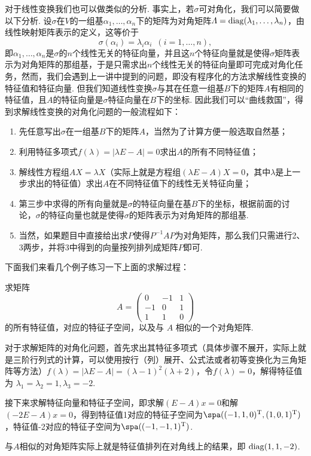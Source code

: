 对于线性变换我们也可以做类似的分析. 事实上，若$\sigma$可对角化，我们可以简要做以下分析. 设$\sigma$在$V$的一组基$\alpha_1,\ldots,\alpha_n$下的矩阵为对角矩阵$\varLambda=\operatorname{diag}(\lambda_1,\ldots,\lambda_n)$，由线性映射矩阵表示的定义，这等价于
\[\sigma(\alpha_i)=\lambda_i\alpha_i\enspace(i=1,\ldots,n),\]
即$\alpha_1,\ldots,\alpha_n$是$\sigma$的$n$个线性无关的特征向量，并且这$n$个特征向量就是使得$\sigma$矩阵表示为对角矩阵的那组基，于是只需求出$n$个线性无关的特征向量即可完成对角化任务，然而，我们会遇到上一讲中提到的问题，即没有程序化的方法求解线性变换的特征值和特征向量. 但我们知道线性变换$\sigma$与其在任意一组基$B$下的矩阵$A$有相同的特征值，且$A$的特征向量是$\sigma$特征向量在$B$下的坐标. 因此我们可以``曲线救国''，得到求解线性变换的对角化问题的一般流程如下：

\begin{enumerate}
    \item 先任意写出$\sigma$在一组基$B$下的矩阵$A$，当然为了计算方便一般选取自然基；

    \item 利用特征多项式$f(\lambda)=|\lambda E-A|=0$求出$A$的所有不同特征值；

    \item 解线性方程组$AX=\lambda X$（实际上就是方程组$(\lambda E-A)X=0$，其中$\lambda$是上一步求出的特征值）求出$A$在不同特征值下的线性无关特征向量；

    \item 第三步中求得的所有向量就是$\sigma$的特征向量在基$B$下的坐标，根据前面的讨论，$\sigma$的特征向量也就是使得$\sigma$的矩阵表示为对角矩阵的那组基.

    \item 当然，如果题目中直接给出求$P$使得$P^{-1}AP$为对角矩阵，那么我们只需进行2、3两步，并将3中得到的向量按列排列成矩阵$P$即可.
\end{enumerate}

下面我们来看几个例子练习一下上面的求解过程：
\begin{example}{}{}
    求矩阵
    \[A=\begin{pmatrix}
            0  & -1 & 1 \\
            -1 & 0  & 1 \\
            1  & 1  & 0
        \end{pmatrix}\]
    的所有特征值，对应的特征子空间，以及与 $A$ 相似的一个对角矩阵.
\end{example}

\begin{solution}
    对于求解矩阵的对角化问题，首先求出其特征多项式（具体步骤不展开，实际上就是三阶行列式的计算，可以使用按行（列）展开、公式法或者初等变换化为三角矩阵等方法）$f(\lambda)=|\lambda E-A|=(\lambda-1)^2(\lambda+2)$，令$f(\lambda)=0$，解得特征值为 $\lambda_1=\lambda_2=1,\lambda_3=-2$.

    接下来求解特征向量和特征子空间，即求解$(E-A)x=0$和解$(-2E-A)x=0$，得到特征值1对应的特征子空间为$\spa((-1,1,0)^{\mathrm{T}},(1,0,1)^{\mathrm{T}})$，特征值-2对应的特征子空间为$\spa((-1,-1,1)^{\mathrm{T}})$.

    与$A$相似的对角矩阵实际上就是特征值排列在对角线上的结果，即 $\operatorname{diag}(1,1,-2)$.
\end{solution}

